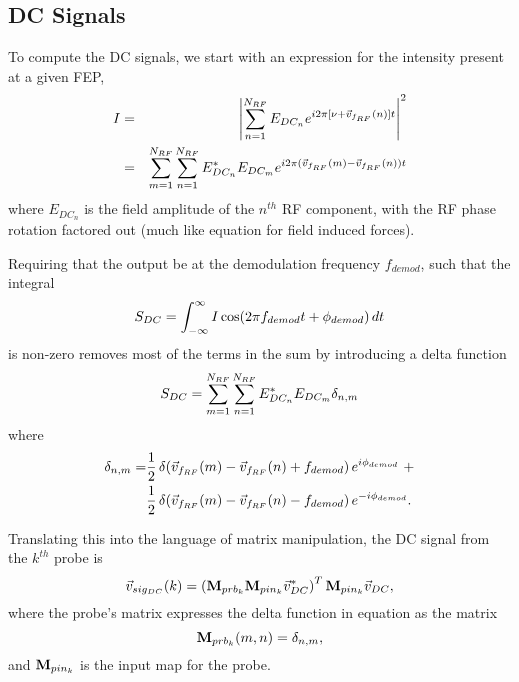 \documentclass[12pt]{article}
\begin{document}
\subsection{DC Signals}
To compute the DC signals, we start with an expression for the intensity present at a given FEP,
\begin{eqnarray}
I &=& \left| \sum^{\Nrf}_{n = 1} E_{DC_n} e^{i 2 \pi [\nu + \vFrf(n)] t}  \right|^2 \\
 &=& \sum^{\Nrf}_{m = 1} \sum^{\Nrf}_{n = 1}
 E^*_{DC_n} E_{DC_m} e^{i 2 \pi (\vFrf(m) - \vFrf(n)) t}
\elabel{intensity}
\end{eqnarray}
where $E_{DC_n}$ is the field amplitude of the $n^{th}$ RF component, with the RF phase rotation factored out (much like equation  for field induced forces).

Requiring that the output be at the demodulation frequency $f_{demod}$, such that the integral
\begin{equation}
S_{DC} = \int^{\infty}_{-\infty} I \cos\!\left( {2 \pi f_{demod} t + \phi_{demod}} \right) dt
\end{equation}
is non-zero removes most of the terms in the sum by introducing a delta function
\begin{equation}
S_{DC} = \sum^{\Nrf}_{m = 1} \sum^{\Nrf}_{n = 1}
 E^*_{DC_n} E_{DC_m} \delta_{n,m}
\elabel{sigDC}
\end{equation}
where
\begin{align*}
\delta_{n,m} =
& \frac{1}{2} \,{\delta}\!\left( {\vec{v}_{f_{RF}}(m) - \vec{v}_{f_{RF}}(n) + f_{demod}} \right) e^{ i \phi_{demod}} ~ + \\
& \frac{1}{2} \,{\delta}\!\left( {\vec{v}_{f_{RF}}(m) - \vec{v}_{f_{RF}}(n) - f_{demod}} \right) e^{-i \phi_{demod}}.
\end{align*}

Translating this into the language of matrix manipulation, the DC signal from the $k^{th}$ probe is
\begin{equation}
\vec{v}_{sig_{DC}}(k) = \left( \mathbf{M}_{prb_{k}} \mathbf{M}_{pin_{k}} \vec{v}_{DC}^* \right) ^T \mathbf{M}_{pin_{k}} \vec{v}_{DC},
\end{equation}
where the probe's matrix expresses the delta function in equation  as the matrix
\begin{equation}
\mathbf{M}_{prb_{k}}(m,n) = \delta_{n,m} ,
\end{equation}
and $\mathbf{M}_{pin_{k}}$ is the input map for the probe.
\end{document}
